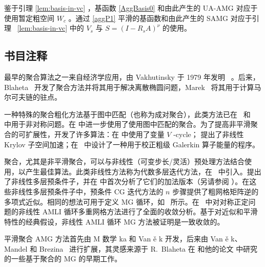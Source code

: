 \documentclass[12pt]{acta_2011xz}
\begin{document}
鉴于引理    \ref{lem:basis-in-vc}    ，基函数
   \eqref{AggBasis0}    和由此产生的 UA-AMG 对应于使用暂定粗空间    $W_c$    。通过    \eqref{aggP1}    平滑的基函数和由此产生的 SAMG 对应于引理~    \ref{lem:basis-in-vc}    中的
   $V_s$    与    $S=(I-R_sA)^\nu$    的使用。  

   \subsection{书目注释  }    最早的聚合算法之一来自经济学应用，由 Vakhutinsky 于 1979 年发明~    \cite{Vakhutinsky.I;Dudkin.L;Ryvkin.A.1979a}    。后来，Blaheta~    \cite{Blaheta.R.1986a}    开发了聚合方法并将其用于解决离散椭圆问题，Marek~    \cite{Marek.I.1991a}    将其用于计算马尔可夫链的驻点。  

一种特殊的聚合粗化方法基于图中匹配（也称为成对聚合），此类方法已在~   \cite{Kim.H;Xu.J;Zikatanov.L.2003b}    和~   \cite{2004KimH_XuJ_ZikatanovL-aa}    中用于非对称问题。在
   \cite{Notay.Y.2010b,Brannick.J;Chen.Y;Zikatanov.L.2012a,Livne.O;Brandt.A.2012a,DAmbra.P;Vassilevski.P.2014a,DAmbra.P;Vassilevski.P.2013a}    中进一步使用了使用图中匹配的聚合。为了提高非平滑聚合的可扩展性，开发了许多算法：在    \cite{Kim.H;Xu.J;Zikatanov.L.2003b}    中使用了变量    $V$    -cycle；
   \cite{Notay.Y;Vassilevski.P.2008a}    提出了非线性 Krylov 子空间加速；在~   \cite{Olson.L;Schroder.J;Tuminaro.R.2011a}    中设计了一种用于校正粗级 Galerkin 算子能量的程序。  

聚合，尤其是非平滑聚合，可以与非线性（可变步长/灵活）预处理方法结合使用，以产生最佳算法。此类非线性方法称为代数多层迭代方法，在~   \cite{Axelsson.O;Vassilevski.P1991a}    中引入。提出了非线性多层预条件子，并在    \cite{Axelsson.O;Vassilevski.P1994}    中首次分析了它们的加法版本（另请参阅
   \cite{Golub.G;Ye.Q1999a,Notay.Y2000,Saad.Y2003,Kraus.J2002}   ）。在这些非线性多层预条件子中，预条件 CG 迭代方法的    $n$    步骤提供了粗网格矩阵逆的多项式近似。相同的想法可用于定义 MG 循环，如~    \cite{Vassilevski.P2008,Notay.Y;Vassilevski.P2008}    所示。在~    \cite{Hu.X;Vassilevski.P;Xu.J2012a}    中对对称正定问题的非线性 AMLI 循环多重网格方法进行了全面的收敛分析。基于对近似和平滑特性的经典假设，非线性 AMLI 循环 MG 方法被证明是一致收敛的。  

平滑聚合 AMG 方法首先由 M  { 数学   }  ka 和 Van    \v{e}    k    \cite{Mika.S;Vanek.P.1992a,Mika.S;Vanek.P.1992b}    开发，后来由 Van    \v{e}    k、Mandel 和 Brezina~    \cite{Vanek.P;Mandel.J;Brezina.M.1996a}    进行扩展，其灵感来源于 R.~Blaheta 在
   \cite{Blaheta.R.1986a}    和他的论文    \cite{Blaheta.R.1988a}    中研究的一些基于聚合的 MG 的早期工作。  
\end{document}
